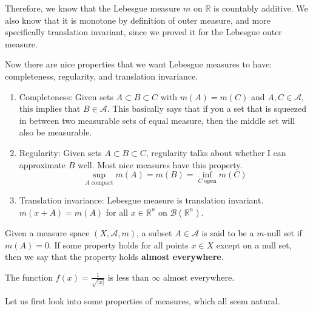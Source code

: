   Therefore, we know that the Lebesgue measure $m$ on $\mathbb{R}$ is countably additive. We also know that it is monotone by definition of outer measure, and more specifically translation invariant, since we proved it for the Lebesgue outer measure. 

  Now there are nice properties that we want Lebesgue measures to have: completeness, regularity, and translation invariance. 
  \begin{enumerate}
    \item Completeness: Given sets $A \subset B \subset C$ with $m(A) = m(C)$ and $A, C \in \mathcal{A}$, this implies that $B \in \mathcal{A}$. This basically says that if you a set that is squeezed in between two measurable sets of equal measure, then the middle set will also be measurable. 

    \item Regularity: Given sets $A \subset B \subset C$, regularity talks about whether I can approximate $B$ well. Most nice measures have this property. 
    \begin{equation}
      \sup_{A \text{ compact}} m(A) = m(B) = \inf_{C \text{ open}} m(C)
    \end{equation}

    \item Translation invariance: Lebesgue measure is translation invariant. $m(x + A) = m(A)$ for all $x \in \mathbb{R}^n$ on $\mathcal{B}(\mathbb{R}^n)$. 
  \end{enumerate}

  \begin{definition}
    Given a measure space $(X, \mathcal{A}, m)$, a subset $A \in \mathcal{A}$ is said to be a $m$-null set if $m(A) = 0$. If some property holds for all points $x \in X$ except on a null set, then we say that the property holds \textbf{almost everywhere}.
  \end{definition}

  \begin{example}
    The function $f(x) = \frac{1}{\sqrt{|x|}}$ is less than $\infty$ almost everywhere. 
  \end{example}

  Let us first look into some properties of measures, which all seem natural. 

